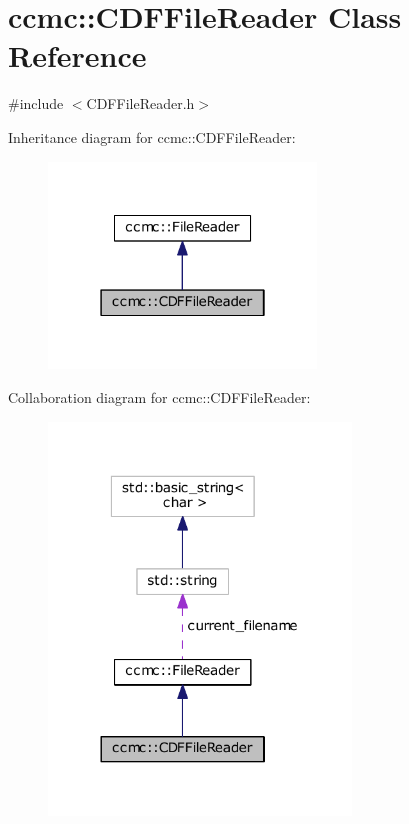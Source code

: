 \hypertarget{classccmc_1_1_c_d_f_file_reader}{\section{ccmc\-:\-:C\-D\-F\-File\-Reader Class Reference}
\label{classccmc_1_1_c_d_f_file_reader}
}


{\ttfamily \#include $<$C\-D\-F\-File\-Reader.\-h$>$}



Inheritance diagram for ccmc\-:\-:C\-D\-F\-File\-Reader\-:\nopagebreak
\begin{figure}[H]
\begin{center}
\leavevmode
\includegraphics[width=202pt]{classccmc_1_1_c_d_f_file_reader__inherit__graph}
\end{center}
\end{figure}


Collaboration diagram for ccmc\-:\-:C\-D\-F\-File\-Reader\-:\nopagebreak
\begin{figure}[H]
\begin{center}
\leavevmode
\includegraphics[width=228pt]{classccmc_1_1_c_d_f_file_reader__coll__graph}
\end{center}
\end{figure}
